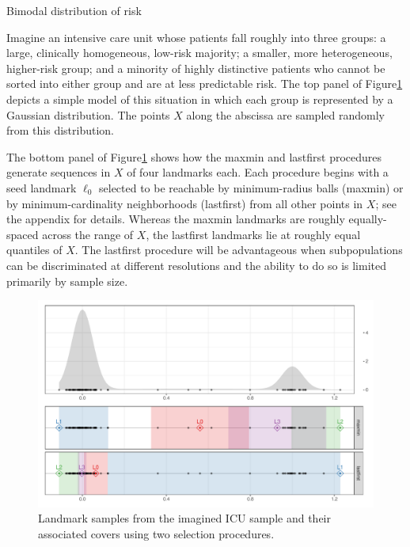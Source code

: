\documentclass{article}
\begin{document}
\begin{example}{Bimodal distribution of risk}

Imagine an intensive care unit whose patients fall roughly into three groups: a large, clinically homogeneous, low-risk majority; a smaller, more heterogeneous, higher-risk group; and a minority of highly distinctive patients who cannot be sorted into either group and are at less predictable risk.
The top panel of Figure\nbs\ref{fig:icu-cover} depicts a simple model of this situation in which each group is represented by a Gaussian distribution.
The points $X$ along the abscissa are sampled randomly from this distribution.

The bottom panel of Figure\nbs\ref{fig:icu-cover} shows how the maxmin and lastfirst procedures generate sequences in $X$ of four landmarks each.
Each procedure begins with a seed landmark $\ell_0$ selected to be reachable by minimum-radius balls (maxmin) or by minimum-cardinality neighborhoods (lastfirst) from all other points in $X$; see the appendix for details.
Whereas the maxmin landmarks are roughly equally-spaced across the range of $X$, the lastfirst landmarks lie at roughly equal quantiles of $X$.
The lastfirst procedure will be advantageous when subpopulations can be discriminated at different resolutions and the ability to do so is limited primarily by sample size.

\begin{figure}
\includegraphics[width=\textwidth]{vardens-cover}
\caption{
Landmark samples from the imagined ICU sample and their associated covers using two selection procedures.
\label{fig:icu-cover}
}
\end{figure}

\end{example}
\end{document}
